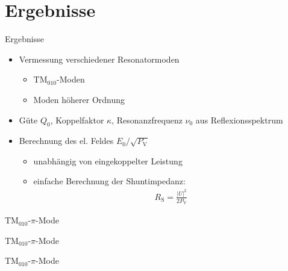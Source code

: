 \documentclass[12pt,xcolor=dvipsnames,professionalfonts]{beamer}
\begin{document}
\section{Ergebnisse}
\begin{frame}{Ergebnisse}
	\begin{itemize}
		\setlength\itemsep{1.25em}
		\item Vermessung verschiedener Resonatormoden	
		\begin{itemize}
			\setlength\itemsep{0.25em}
			\item $\mathrm{TM}_{010}$-Moden
			\item Moden höherer Ordnung
		\end{itemize}
		
		\item Güte $Q_0$, Koppelfaktor $\kappa$, Resonanzfrequenz $\nu_0$ aus Reflexionsspektrum
		
		\item Berechnung des el. Feldes $E_0 / \sqrt{P_\mathrm{V}}$
		\begin{itemize}
			\setlength\itemsep{0.25em}
			\item unabhängig von eingekoppelter Leistung
			\item einfache Berechnung der Shuntimpedanz:
			\begin{align*}
			R_\mathrm{S} = \frac{|U|^2}{2 P_\mathrm{V}}
			\end{align*}
			
		\end{itemize}
	\end{itemize}
\end{frame}

\begin{frame}{$\text{TM}_{010}$-$\pi$-Mode}
	\centering
	
\end{frame}
\begin{frame}{$\text{TM}_{010}$-$\pi$-Mode}
	\centering
	
\end{frame}
\begin{frame}{$\text{TM}_{010}$-$\pi$-Mode}
	\addtocounter{framenumber}{-1}
	\centering
	
\end{frame}
\end{document}
